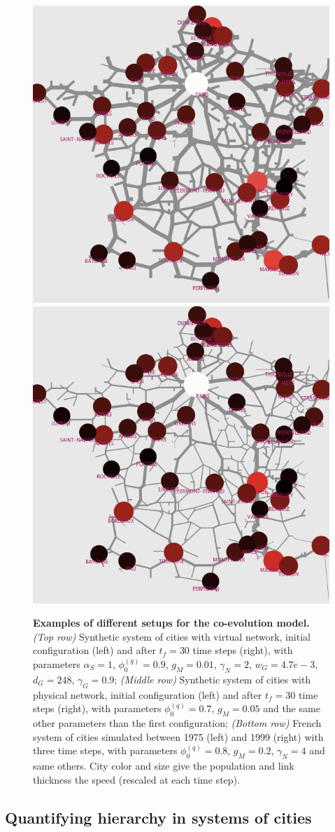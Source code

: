 \documentclass[english,fleqn,allpages]{ISTE_science}[2018/07/30]
\begin{document}
\begin{figure}
	\includegraphics[width=0.48\linewidth]{figures/ex_realphysical_1975_t0.png}
	\includegraphics[width=0.48\linewidth]{figures/ex_realphysical_1975_tf.png}
	\caption{\footnotesize\textbf{Examples of different setups for the co-evolution model.} \textit{(Top row)} Synthetic system of cities with virtual network, initial configuration (left) and after $t_f=30$ time steps (right), with parameters $\alpha_S = 1$, $\phi^{(q)}_0 = 0.9$, $g_M = 0.01$, $\gamma_N=2$, $w_G=4.7e-3$, $d_G=248$, $\gamma_G=0.9$; \textit{(Middle row)} Synthetic system of cities with physical network, initial configuration (left) and after $t_f=30$ time steps (right), with parameters $\phi^{(q)}_0 = 0.7$, $g_M = 0.05$ and the same other parameters than the first configuration; \textit{(Bottom row)} French system of cities simulated between 1975 (left) and 1999 (right) with three time steps, with parameters $\phi^{(q)}_0 = 0.8$, $g_M = 0.2$, $\gamma_N=4$ and same others. City color and size give the population and link thickness the speed (rescaled at each time step).\label{fig:examples}}
\end{figure}



\subsection{Quantifying hierarchy in systems of cities}
\end{document}

